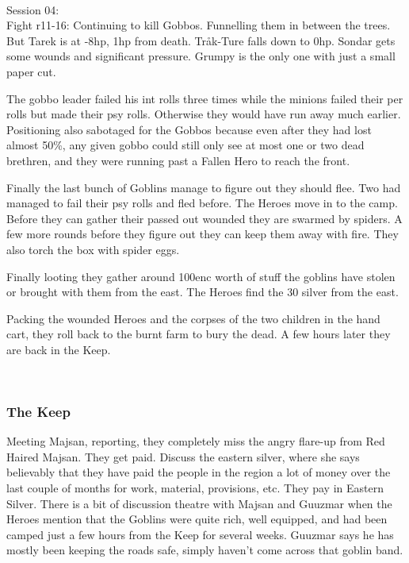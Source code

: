 \

Session 04:\\                                                           %
Fight r11-16: Continuing to kill Gobbos. Funnelling them in between the trees. But Tarek is at -8hp, 1hp from death. Tråk-Ture falls down to 0hp. Sondar gets some wounds and significant pressure. Grumpy is the only one with just a small paper cut.

\begin{readoutloud}
The gobbo leader failed his int rolls three times while the minions failed their per rolls but made their psy rolls. Otherwise they would have run away much earlier. Positioning also sabotaged for the Gobbos because even after they had lost almost 50\%, any given gobbo could still only see at most one or two dead brethren, and they were running past a Fallen Hero to reach the front.
\end{readoutloud}

Finally the last bunch of Goblins manage to figure out they should flee. Two had managed to fail their psy rolls and fled before. The Heroes move in to the camp. Before they can gather their passed out wounded they are swarmed by spiders. A few more rounds before they figure out they can keep them away with fire. They also torch the box with spider eggs.

Finally looting they gather around 100enc worth of stuff the goblins have stolen or brought with them from the east. The Heroes find the 30 silver from the east.

Packing the wounded Heroes and the corpses of the two children in the hand cart, they roll back to the burnt farm to bury the dead. A few hours later they are back in the Keep.

\

\subsubsection*{The Keep}
Meeting Majsan, reporting, they completely miss the angry flare-up from Red Haired Majsan. They get paid. Discuss the eastern silver, where she says believably that they have paid the people in the region a lot of money over the last couple of months for work, material, provisions, etc. They pay in Eastern Silver. There is a bit of discussion theatre with Majsan and Guuzmar when the Heroes mention that the Goblins were quite rich, well equipped, and had been camped just a few hours from the Keep for several weeks. Guuzmar says he has mostly been keeping the roads safe, simply haven't come across that goblin band.


